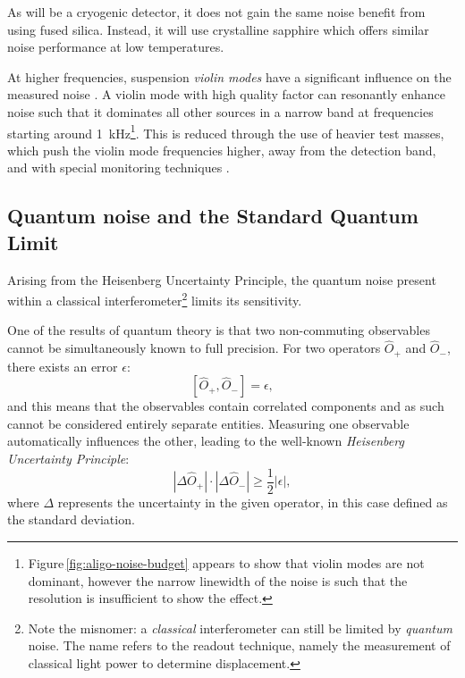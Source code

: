 As \KAGRA{} will be a cryogenic detector, it does not gain the same noise benefit from using fused silica. Instead, it will use crystalline sapphire which offers similar noise performance at low temperatures.

At higher frequencies, suspension \emph{violin modes} have a significant influence on the measured noise \cite{Robertson2002}. A violin mode with high quality factor can resonantly enhance noise such that it dominates all other sources in a narrow band at frequencies starting around \SI{1}{\kilo\hertz}\footnote{Figure\,\ref{fig:aligo-noise-budget} appears to show that violin modes are not dominant, however the narrow linewidth of the noise is such that the resolution is insufficient to show the effect.}. This is reduced through the use of heavier test masses, which push the violin mode frequencies higher, away from the detection band, and with special monitoring techniques \cite{Sorazu2010}.

\subsection{Quantum noise and the Standard Quantum Limit}
Arising from the Heisenberg Uncertainty Principle, the quantum noise present within a classical interferometer\footnote{Note the misnomer: a \emph{classical} interferometer can still be limited by \emph{quantum} noise. The name refers to the readout technique, namely the measurement of classical light power to determine displacement.} limits its sensitivity.

One of the results of quantum theory is that two non-commuting observables cannot be simultaneously known to full precision. For two operators $\hat{O}_+$ and $\hat{O}_-$, there exists an error $\epsilon$:
\begin{equation}
 \left[ \hat{O}_+, \hat{O}_- \right] = \epsilon,
\end{equation}
and this means that the observables contain correlated components and as such cannot be considered entirely separate entities. Measuring one observable automatically influences the other, leading to the well-known \emph{Heisenberg Uncertainty Principle}:
\begin{equation}
 \left| \Delta \hat{O}_+ \right| \cdot \left| \Delta \hat{O}_- \right| \geq
\frac{1}{2} \left| \epsilon \right|,
\end{equation}
where $\Delta$ represents the uncertainty in the given operator, in this case defined as the standard deviation.

